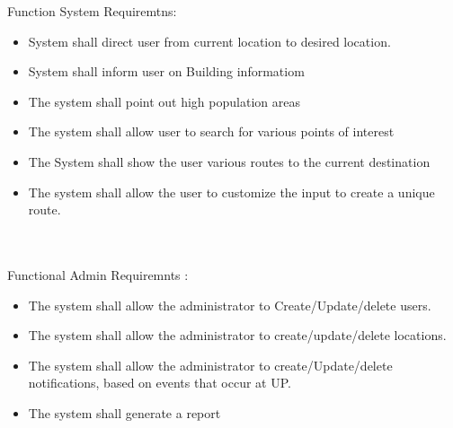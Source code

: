 {
Function System Requiremtns:
\begin{itemize}
  \item System shall direct user from current location to desired location.
  \item System shall inform user on Building informatiom
  \item The system shall point out high population areas
  \item The system shall allow user to search for various points of interest
  \item The System shall show the user various routes to the current destination
  \item The system shall allow the user to customize the input to create a unique route.
\end{itemize}
\\\\
Functional Admin Requiremnts :
\begin{itemize}
  \item The system shall allow the administrator to Create/Update/delete users.
  \item The system shall allow the administrator to create/update/delete locations.
  \item The system shall allow the administrator to create/Update/delete notifications, based on events that occur at UP. 
  \item The system shall generate a report
\end{itemize}
}
